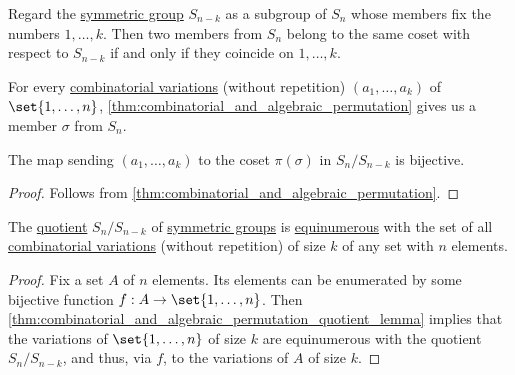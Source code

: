 \begin{lemma}\label{thm:combinatorial_and_algebraic_permutation_quotient_lemma}
  Regard the \hyperref[def:symmetric_group]{symmetric group} \( S_{n - k} \) as a subgroup of \( S_n \) whose members fix the numbers \( 1, \ldots, k \). Then two members from \( S_n \) belong to the same coset with respect to \( S_{n - k} \) if and only if they coincide on \( 1, \ldots, k \).

  For every \hyperref[def:combinatorial_variation]{combinatorial variations} (without repetition) \( (a_1, \ldots, a_k) \) of \( \set{ 1, \ldots, n } \), \cref{thm:combinatorial_and_algebraic_permutation} gives us a member \( \sigma \) from \( S_n \).

  The map sending \( (a_1, \ldots, a_k) \) to the coset \( \pi(\sigma) \) in \( S_n / S_{n - k} \) is bijective.
\end{lemma}
\begin{proof}
  Follows from \cref{thm:combinatorial_and_algebraic_permutation}.
\end{proof}

\begin{proposition}\label{thm:combinatorial_and_algebraic_permutation_quotient}
  The \hyperref[def:group/quotient]{quotient} \( S_n / S_{n - k} \) of \hyperref[def:symmetric_group]{symmetric groups} is \hyperref[def:equinumerosity]{equinumerous} with the set of all \hyperref[def:combinatorial_variation]{combinatorial variations} (without repetition) of size \( k \) of any set with \( n \) elements.
\end{proposition}
\begin{proof}
  Fix a set \( A \) of \( n \) elements. Its elements can be enumerated by some bijective function \( f: A \to \set{ 1, \ldots, n } \). Then \cref{thm:combinatorial_and_algebraic_permutation_quotient_lemma} implies that the variations of \( \set{ 1, \ldots, n } \) of size \( k \) are equinumerous with the quotient \( S_n / S_{n - k} \), and thus, via \( f \), to the variations of \( A \) of size \( k \).
\end{proof}

